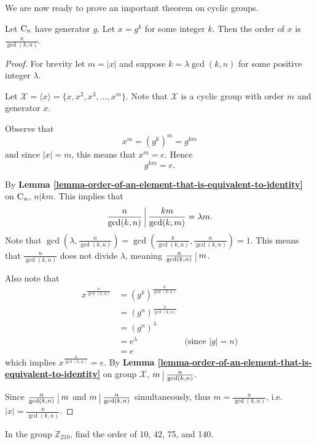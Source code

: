 \newpage

We are now ready to prove an important theorem on cyclic groups.
\begin{theorem}\label{thrm-order-of-element-in-cyclic-group}
    Let $\mathrm{C}_{n}$ have generator $g$. Let $x = g^k$ for some integer $k$. Then the order of $x$ is $\frac{n}{\gcd(k,n)}$.
\end{theorem}
\begin{proof}
    For brevity let $m = |x|$ and suppose $k = \lambda \gcd(k, n)$ for some positive integer $\lambda$.

    Let $\mathcal{X} = \langle x \rangle = \{x, x^2, x^3, \dots, x^m\}$. Note that $\mathcal{X}$ is a cyclic group with order $m$ and generator $x$.

    Observe that
    \[
        x^m = \left(g^k\right)^m = g^{km}
    \]
    and since $|x| = m$, this means that $x^m = e$. Hence
    \[
        g^{km} = e.
    \]

    By \textbf{Lemma \ref{lemma-order-of-an-element-that-is-equivalent-to-identity}} on $\mathrm{C}_{n}$, $n \vert km$. This implies that
    \[
        \frac{n}{\gcd(k,n)} \ \vline \ \frac{km}{\gcd(k,m)}    = \lambda m.
    \]
    Note that $\gcd\left(\lambda, \frac{n}{\gcd(k,n)}\right) = \gcd\left(\frac{k}{\gcd(k,n)}, \frac{n}{\gcd(k,n)}\right) = 1$. This means that $\frac{n}{\gcd(k,n)}$ does not divide $\lambda$, meaning $\frac{n}{\gcd(k,n)} \ \vline \ m$.

    Also note that
    \begin{align*}
        x^{\frac{n}{\gcd(k,n)}} &= \left(g^k\right)^{\frac{n}{\gcd(k,n)}}\\
        &= \left(g^n\right)^{\frac{k}{\gcd(k,n)}}\\
        &= \left(g^n\right)^\lambda\\
        &= e^\lambda & \text{(since } |g| = n)\\
        &= e
    \end{align*}
    which implies $x^{\frac{n}{\gcd(k,n)}} = e$. By \textbf{Lemma \ref{lemma-order-of-an-element-that-is-equivalent-to-identity}} on group $\mathcal{X}$, $m \ \vline \ \frac{n}{\gcd(k,n)}$.

    Since $\frac{n}{\gcd(k,n)} \ \vline \ m$ and $m \ \vline \ \frac{n}{\gcd(k,n)}$ simultaneously, thus $m = \frac{n}{\gcd(k,n)}$, i.e. $|x| = \frac{n}{\gcd(k,n)}$.
\end{proof}

\begin{exercise}
    In the group $\mathbb{Z}_{210}$, find the order of 10, 42, 75, and 140.
\end{exercise}

